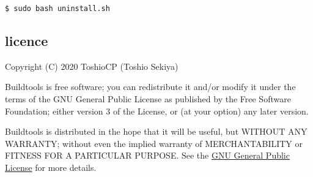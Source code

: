 \begin{verbatim}
$ sudo bash uninstall.sh
\end{verbatim}

\hypertarget{licence}{%
\subsection{licence}\label{licence}}

Copyright (C) 2020 ToshioCP (Toshio Sekiya)

Buildtools is free software; you can redistribute it and/or modify it
under the terms of the GNU General Public License as published by the
Free Software Foundation; either version 3 of the License, or (at your
option) any later version.

Buildtools is distributed in the hope that it will be useful, but
WITHOUT ANY WARRANTY; without even the implied warranty of
MERCHANTABILITY or FITNESS FOR A PARTICULAR PURPOSE. See the
\href{https://www.gnu.org/licenses/gpl-3.0.html}{GNU General Public
License} for more details.
